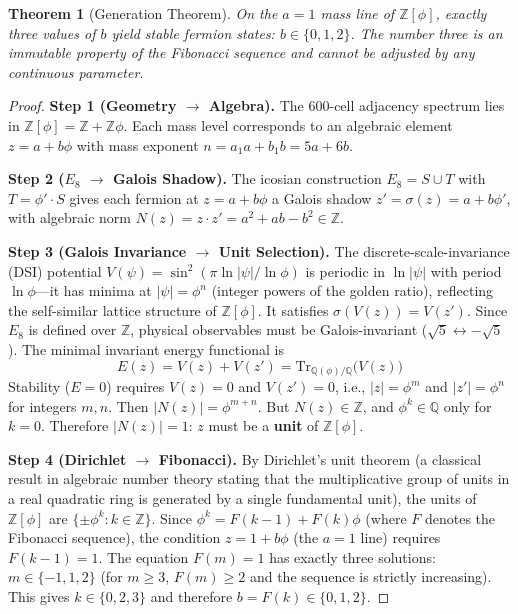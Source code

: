 \documentclass[12pt,a4paper]{article}
\newtheorem{theorem}{Theorem}
\theoremstyle{definition}
\begin{document}
\begin{theorem}[Generation Theorem]
On the $a = 1$ mass line of $\mathbb{Z}[\phi]$, exactly three values of $b$ yield stable fermion states: $b \in \{0, 1, 2\}$. The number three is an immutable property of the Fibonacci sequence and cannot be adjusted by any continuous parameter.
\end{theorem}

\begin{proof}
\textbf{Step 1 (Geometry $\to$ Algebra).} The 600-cell adjacency spectrum lies in $\mathbb{Z}[\phi] = \mathbb{Z} + \mathbb{Z}\phi$. Each mass level corresponds to an algebraic element $z = a + b\phi$ with mass exponent $n = a_1 a + b_1 b = 5a + 6b$.

\textbf{Step 2 ($E_8$ $\to$ Galois Shadow).} The icosian construction $E_8 = S \cup T$ with $T = \phi' \cdot S$ gives each fermion at $z = a + b\phi$ a Galois shadow $z' = \sigma(z) = a + b\phi'$, with algebraic norm $N(z) = z \cdot z' = a^2 + ab - b^2 \in \mathbb{Z}$.

\textbf{Step 3 (Galois Invariance $\to$ Unit Selection).} The discrete-scale-invariance (DSI) potential $V(\psi) = \sin^2(\pi \ln|\psi|/\ln\phi)$ is periodic in $\ln|\psi|$ with period $\ln\phi$---it has minima at $|\psi| = \phi^n$ (integer powers of the golden ratio), reflecting the self-similar lattice structure of $\mathbb{Z}[\phi]$.  It satisfies $\sigma(V(z)) = V(z')$. Since $E_8$ is defined over $\mathbb{Z}$, physical observables must be Galois-invariant ($\sqrt{5} \leftrightarrow -\sqrt{5}$). The minimal invariant energy functional is
\begin{equation}
E(z) = V(z) + V(z') = \text{Tr}_{\mathbb{Q}(\phi)/\mathbb{Q}}\bigl(V(z)\bigr)
\end{equation}
Stability ($E = 0$) requires $V(z) = 0$ and $V(z') = 0$, i.e., $|z| = \phi^m$ and $|z'| = \phi^n$ for integers $m, n$. Then $|N(z)| = \phi^{m+n}$. But $N(z) \in \mathbb{Z}$, and $\phi^k \in \mathbb{Q}$ only for $k = 0$. Therefore $|N(z)| = 1$: $z$ must be a \textbf{unit} of $\mathbb{Z}[\phi]$.

\textbf{Step 4 (Dirichlet $\to$ Fibonacci).} By Dirichlet's unit theorem (a classical result in algebraic number theory stating that the multiplicative group of units in a real quadratic ring is generated by a single fundamental unit), the units of $\mathbb{Z}[\phi]$ are $\{\pm\phi^k : k \in \mathbb{Z}\}$. Since $\phi^k = F(k-1) + F(k)\phi$ (where $F$ denotes the Fibonacci sequence), the condition $z = 1 + b\phi$ (the $a = 1$ line) requires $F(k-1) = 1$. The equation $F(m) = 1$ has exactly three solutions: $m \in \{-1, 1, 2\}$ (for $m \geq 3$, $F(m) \geq 2$ and the sequence is strictly increasing). This gives $k \in \{0, 2, 3\}$ and therefore $b = F(k) \in \{0, 1, 2\}$.


\end{proof}
\end{document}

